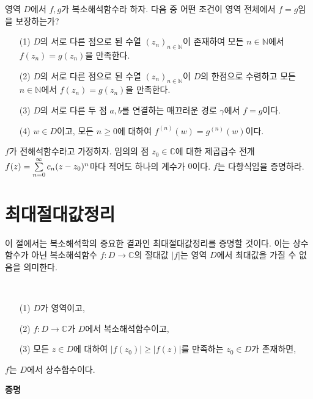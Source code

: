 \begin{salt_exercise} \label{ex-4-24}
영역 $D$에서 $f,g$가 복소해석함수라 하자.
다음 중 어떤 조건이 영역 전체에서 $f=g$임을 보장하는가?
\begin{itemize}
\item[(1)] 
$D$의 서로 다른 점으로 된 수열 $(z_n)_{n\in\mathbb N}$이 존재하여
모든 $n\in \mathbb N$에서 $f(z_n) = g(z_n)$을 만족한다.
\item[(2)] $D$의 서로 다른 점으로 된 수열 $(z_n)_{n\in\mathbb N}$이 $D$의 한점으로 수렴하고
모든 $n\in \mathbb N$에서 $f(z_n) = g(z_n)$을 만족한다.
\item[(3)] $D$의 서로 다른 두 점 $a,b$를 연결하는 매끄러운 경로 $\gamma$에서
$f=g$이다.
\item[(4)]  $w\in D$이고, 모든 $n\ge0$에 대하여 $f^{(n)}(w) = g^{(n)}(w)$이다.
\end{itemize}
\end{salt_exercise}

\begin{salt_exercise} \label{ex-4-25}
$f$가 전해석함수라고 가정하자.
임의의 점 $z_0\in \mathbb C$에 대한 제곱급수 전개
$f(z) = \sum\limits_{n=0}^\infty c_n(z-z_0)^n$마다 적어도 하나의 계수가 $0$이다.
$f$는 다항식임을 증명하라.
\end{salt_exercise}

\section{최대절대값정리}

이 절에서는 복소해석학의 중요한 결과인  최대절대값정리를 증명할 것이다.
이는 상수함수가 아닌 복소해석함수 $f:D\to\mathbb C$의 절대값 $|f|$는 영역 $D$에서
최대값을 가질 수 없음을 의미한다.

\begin{salt_theorem} [최대절대값정리] \label{thm-4-6}
\
\begin{itemize}
\item[(1)] $D$가 영역이고,
\item[(2)] $f:D\to\mathbb C$가 $D$에서 복소해석함수이고,
\item[(3)] 모든 $z\in D$에 대하여 $|f(z_0)| \ge |f(z)|$를 만족하는 $z_0\in D$가 존재하면,
\end{itemize}
$f$는 $D$에서 상수함수이다.
\end{salt_theorem}

{\bf 증명}

